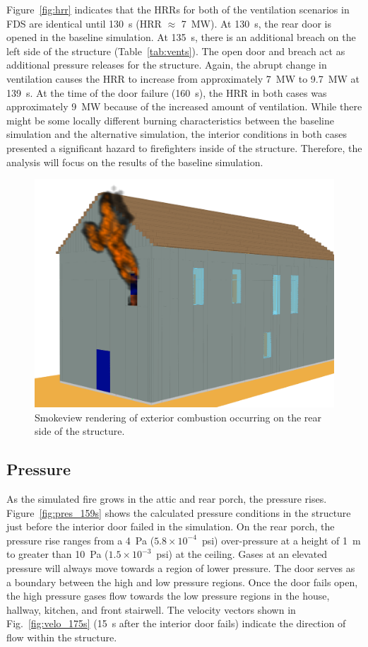 Figure~\ref{fig:hrr} indicates that the HRRs for both of the ventilation scenarios in FDS are identical until 130~s (HRR $\approx$ 7~MW). At 130~s, the rear door is opened in the baseline simulation. At 135~s, there is an additional breach on the left side of the structure (Table~\ref{tab:vents}). The open door and breach act as additional pressure releases for the structure. Again, the abrupt change in ventilation causes the HRR to increase from approximately 7~MW to 9.7~MW at 139~s. At the time of the door failure (160~s), the HRR in both cases was approximately 9~MW because of the increased amount of ventilation. While there might be some locally different burning characteristics between the baseline simulation and the alternative simulation, the interior conditions in both cases presented a significant hazard to firefighters inside of the structure. Therefore, the analysis will focus on the results of the baseline simulation.

\begin{figure}[!ht]
\centering
\includegraphics[width=.675\textwidth]{../Figures/smv_exterior_fire}
\caption{Smokeview rendering of exterior combustion occurring on the rear side of the structure.}
\label{fig:smv_ext_fire}
\end{figure}

\subsection{Pressure}
\label{pres}
As the simulated fire grows in the attic and rear porch, the pressure rises. Figure~\ref{fig:pres_159s} shows the calculated pressure conditions in the structure just before the interior door failed in the simulation. On the rear porch, the pressure rise ranges from a 4~Pa ($5.8 \times 10^{-4}$~psi) over-pressure at a height of 1~m to greater than 10~Pa ($1.5 \times 10^{-3}$~psi) at the ceiling. Gases at an elevated pressure will always move towards a region of lower pressure. The door serves as a boundary between the high and low pressure regions. Once the door fails open, the high pressure gases flow towards the low pressure regions in the house, hallway, kitchen, and front stairwell. The velocity vectors shown in Fig.~\ref{fig:velo_175s} (15~s after the interior door fails) indicate the direction of flow within the structure.

